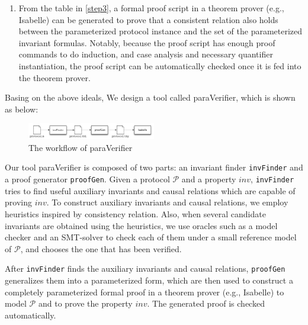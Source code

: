 \documentclass[final]{IEEEtran}
\begin{document}
{\begin{enumerate}
\item From the table in   \ref{step3}, a formal proof script in a theorem prover (e.g., Isabelle)  can be generated to prove that a consistent relation also holds between the parameterized protocol instance and the set of the parameterized invariant formulas. Notably, because the proof script has enough proof commands to do induction, and case analysis and necessary quantifier instantiation, the proof script can be automatically checked once it is fed into the theorem prover.



\end{enumerate}

Basing on the above ideals, We design a tool called {\sf paraVerifier}, which is shown as below:


\begin{figure}[htbp]
\centering %
\includegraphics[width=0.5\textwidth]{paraVerifier.pdf}
\vspace{-0.6cm}
\caption{The workflow of {\sf paraVerifier} \label{fig:arch}
}
\end{figure}

Our tool {\sf paraVerifier} is composed of two parts:  an invariant finder {\tt invFinder}
and a proof generator {\tt proofGen}. %
Given a protocol $\mathcal{P}$ and a property $inv$, {\tt invFinder} tries to find useful auxiliary invariants and causal relations which are capable of proving $inv$. To construct auxiliary invariants and causal relations, we employ heuristics inspired by consistency relation. Also, when several candidate invariants are obtained using the heuristics, we use oracles such as a model checker and an SMT-solver to check each of them under a small reference model of $\mathcal{P}$, and chooses the one that has been verified.


After {\tt invFinder} finds the auxiliary invariants and causal relations, {\tt proofGen} generalizes them  into a parameterized form, which are then used to construct a completely parameterized formal proof in a theorem prover (e.g., Isabelle) to model $\mathcal{P}$ and to prove the property $inv$. The generated proof is checked automatically.  %

}
\end{document}
